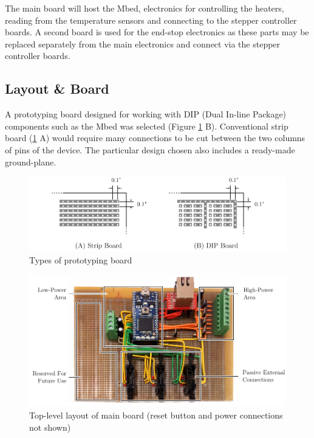 		The main board will host the Mbed, electronics for controlling the heaters,
		reading from the temperature sensors and connecting to the stepper
		controller boards. A second board is used for the end-stop electronics as
		these parts may be replaced separately from the main electronics and connect
		via the stepper controller boards.
		
		\subsection{Layout \& Board}
			
			A prototyping board designed for working with DIP (Dual In-line Package)
			components such as the Mbed was selected (Figure \ref{fig:dipBoard} B).
			Conventional strip board (\ref{fig:dipBoard} A) would require many
			connections to be cut between the two columns of pins of the device. The
			particular design chosen also includes a ready-made ground-plane.
			
			\begin{figure}
				\includegraphics[width=1\textwidth]{diagrams/dipBoard.pdf}
				\caption{Types of prototyping board}
				\label{fig:dipBoard}
			\end{figure}
			
			\begin{figure}
				\includegraphics[width=1\textwidth]{diagrams/mainBoard.pdf}
				\caption{Top-level layout of main board (reset button and power
				         connections not shown)}
				\label{fig:mainBoard}
			\end{figure}
			
